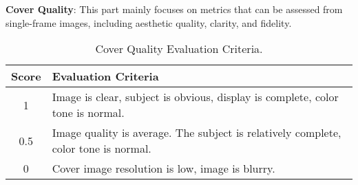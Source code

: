 \newpage
\textbf{Cover Quality}: This part mainly focuses on metrics that can be assessed from single-frame images, including aesthetic quality, clarity, and fidelity.

\begin{table}[h]
\centering
\caption{Cover Quality Evaluation Criteria.}
\label{sample-table}
\small

\begin{tabular}{cp{11cm}}
\toprule

\textbf{Score} & \textbf{Evaluation Criteria} \\
\midrule
1 & Image is clear, subject is obvious, display is complete, color tone is normal. \\
\midrule
0.5 & Image quality is average. The subject is relatively complete, color tone is normal. \\
\midrule
0 & Cover image resolution is low, image is blurry. \\

\bottomrule
\end{tabular}
\end{table}
